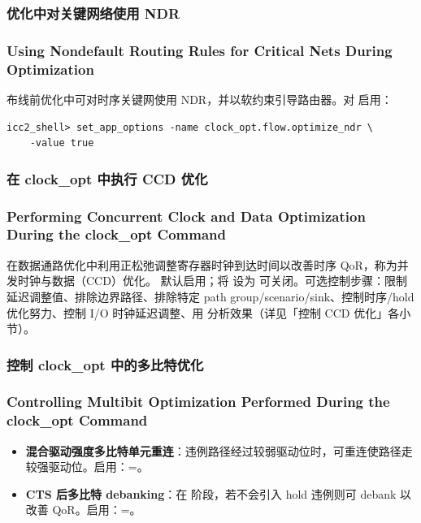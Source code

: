 \subsubsection{优化中对关键网络使用 NDR}
\subsubsection*{Using Nondefault Routing Rules for Critical Nets During Optimization}

布线前优化中可对时序关键网使用 NDR，并以软约束引导路由器。对  启用：
\begin{lstlisting}
icc2_shell> set_app_options -name clock_opt.flow.optimize_ndr \
    -value true
\end{lstlisting}

\subsubsection{在 clock\_opt 中执行 CCD 优化}
\subsubsection*{Performing Concurrent Clock and Data Optimization During the clock\_opt Command}

在数据通路优化中利用正松弛调整寄存器时钟到达时间以改善时序 QoR，称为并发时钟与数据（CCD）优化。 默认启用；将  设为  可关闭。可选控制步骤：限制延迟调整值、排除边界路径、排除特定 path group/scenario/sink、控制时序/hold 优化努力、控制 I/O 时钟延迟调整、用  分析效果（详见「控制 CCD 优化」各小节）。

\subsubsection{控制 clock\_opt 中的多比特优化}
\subsubsection*{Controlling Multibit Optimization Performed During the clock\_opt Command}

\begin{itemize}
  \item \textbf{混合驱动强度多比特单元重连}：违例路径经过较弱驱动位时，可重连使路径走较强驱动位。启用：=。
  \item \textbf{CTS 后多比特 debanking}：在 \cmd{final\_opto} 阶段，若不会引入 hold 违例则可 debank 以改善 QoR。启用：=。
\end{itemize}

